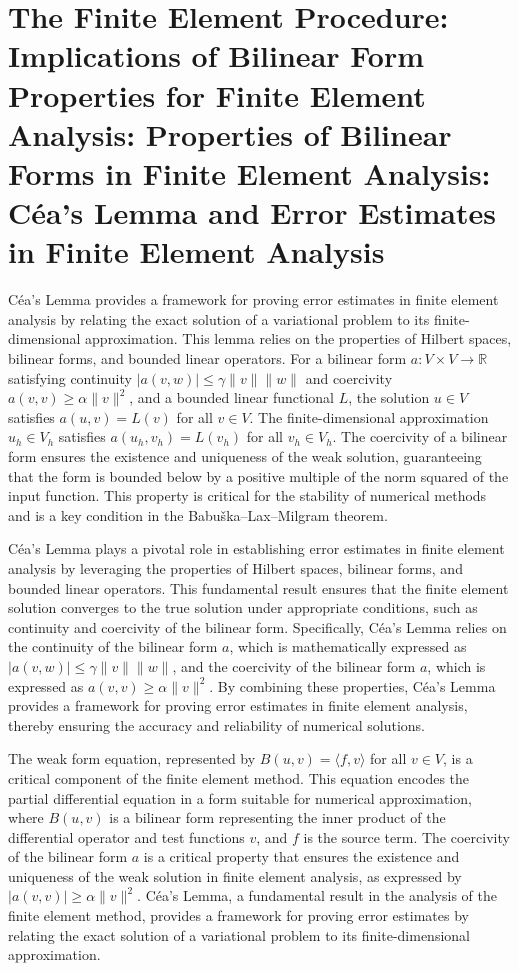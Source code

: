 \documentclass[12pt, a4paper]{article}
\begin{document}
\section{The Finite Element Procedure: Implications of Bilinear Form Properties for Finite Element Analysis: Properties of Bilinear Forms in Finite Element Analysis: Céa's Lemma and Error Estimates in Finite Element Analysis}
\label{sec:b350665b-0de5-496d-acf4-a034a611087b}

Céa's Lemma provides a framework for proving error estimates in finite element analysis by relating the exact solution of a variational problem to its finite-dimensional approximation. This lemma relies on the properties of Hilbert spaces, bilinear forms, and bounded linear operators. For a bilinear form \(a: V \times V \rightarrow \mathbb{R}\) satisfying continuity \(|a(v, w)| \leq \gamma \|v\| \|w\|\) and coercivity \(a(v, v) \geq \alpha \|v\|^2\), and a bounded linear functional \(L\), the solution \(u \in V\) satisfies \(a(u, v) = L(v)\) for all \(v \in V\). The finite-dimensional approximation \(u_h \in V_h\) satisfies \(a(u_h, v_h) = L(v_h)\) for all \(v_h \in V_h\). The coercivity of a bilinear form ensures the existence and uniqueness of the weak solution, guaranteeing that the form is bounded below by a positive multiple of the norm squared of the input function. This property is critical for the stability of numerical methods and is a key condition in the Babuška–Lax–Milgram theorem.

Céa's Lemma plays a pivotal role in establishing error estimates in finite element analysis by leveraging the properties of Hilbert spaces, bilinear forms, and bounded linear operators. This fundamental result ensures that the finite element solution converges to the true solution under appropriate conditions, such as continuity and coercivity of the bilinear form. Specifically, Céa's Lemma relies on the continuity of the bilinear form \(a\), which is mathematically expressed as \(|a(v, w)| \leq \gamma \|v\| \|w\|\), and the coercivity of the bilinear form \(a\), which is expressed as \(a(v, v) \geq \alpha \|v\|^2\). By combining these properties, Céa's Lemma provides a framework for proving error estimates in finite element analysis, thereby ensuring the accuracy and reliability of numerical solutions.

The weak form equation, represented by \(B(u, v) = \langle f, v \rangle\) for all \(v \in V\), is a critical component of the finite element method. This equation encodes the partial differential equation in a form suitable for numerical approximation, where \(B(u, v)\) is a bilinear form representing the inner product of the differential operator and test functions \(v\), and \(f\) is the source term. The coercivity of the bilinear form \(a\) is a critical property that ensures the existence and uniqueness of the weak solution in finite element analysis, as expressed by \(|a(v, v)| \geq \alpha \|v\|^2\). Céa's Lemma, a fundamental result in the analysis of the finite element method, provides a framework for proving error estimates by relating the exact solution of a variational problem to its finite-dimensional approximation.
\end{document}
